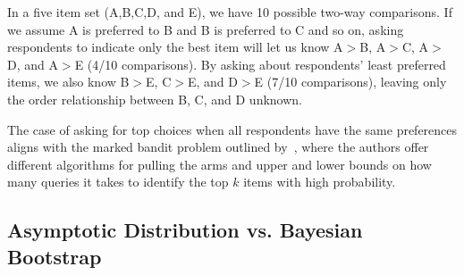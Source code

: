 \documentclass[nonblindrev]{informs3}
\begin{document}
In a five item set (A,B,C,D, and E), we have 10 possible two-way comparisons. If we assume A is preferred to B and B is preferred to C and so on, asking respondents to indicate only the best item will let us know A$>$B, A$>$C, A$>$D, and A$>$E (4/10 comparisons). By asking about respondents' least preferred items, we also know B$>$E, C$>$E, and D$>$E (7/10 comparisons), leaving only the order relationship between B, C, and D unknown.

The case of asking for top choices when all respondents have the same preferences aligns with the marked bandit problem outlined by~\cite{simchowitz2016best}, where the authors offer different algorithms for pulling the arms and upper and lower bounds on how many queries it takes to identify the top $k$ items with high probability. 


\subsection{Asymptotic Distribution vs. Bayesian Bootstrap}
\end{document}
